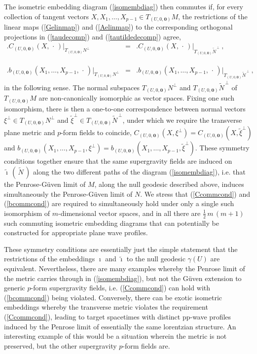 \documentclass[11pt,a4paper]{article}
\newcommand{\mbf}[1]{{\boldsymbol {#1} }}
\def\nn{\nonumber}
\def\bea{\begin{eqnarray}}
\def\eea{\end{eqnarray}}
\begin{document}
The isometric embedding diagram (\ref{isomembdiag}) then commutes if,
for every collection of tangent vectors $X,X_1,\dots,X_{p-1}\in
T_{(U,0,\mbf0)}M$, the restrictions of the linear maps (\ref{Gelinmap})
and (\ref{Aelinmap}) to the corresponding orthogonal projections in
(\ref{taudecomp}) and (\ref{tautildedecomp}) agree,
\bea
\bigl.C_{(U,0,\mbf0)}(X,\,\cdot\,)\bigr|_{T_{(U,0,\mbf0)}N^\perp}&=&
\bigl.C_{(U,0,\mbf0)}(X,\,\cdot\,)\bigr|_{T_{(U,0,\mbf0)}
\widetilde{N}^{\,\perp}} \ , \label{Ccommcond}\\&&{~~~~}^{~~}_{~~}
\nn\\\bigl.b_{(U,0,\mbf0)}(X_1,\ldots,X_{p-1},\,\cdot\,)
\bigr|_{T_{(U,0,\mbf0)}N^\perp}&=&
\bigl.b_{(U,0,\mbf0)}(X_1,\ldots,X_{p-1},\,\cdot\,)\bigr|_{T_{(U,0,\mbf0)}
\widetilde{N}^{\,\perp}} \ ,
\label{bcommcond}\eea
in the following sense. The normal subspaces $T_{(U,0,\mbf0)}N^\perp$ and
$T_{(U,0,\mbf0)}\widetilde{N}^{\,\perp}$ of $T_{(U,0,\mbf0)}M$ are
non-canonically
isomorphic as vector spaces. Fixing one such isomorphism, there is
then a one-to-one correspondence between normal vectors $\xi^\perp\in
T_{(U,0,\mbf0)}N^\perp$ and $\tilde\xi^\perp\in
T_{(U,0,\mbf0)}\widetilde{N}^{\,\perp}$, under which we require the
transverse plane metric and $p$-form fields to coincide,
$C_{(U,0,\mbf0)}(X,\xi^\perp)=C_{(U,0,\mbf0)}(X,\tilde\xi^\perp)$ and
$b_{(U,0,\mbf0)}(X_1,\ldots,X_{p-1},\xi^\perp)=b_{(U,0,\mbf0)}
(X_1,\ldots,X_{p-1},\tilde\xi^\perp)$. These symmetry conditions
together ensure that the same supergravity fields are induced on
$\widetilde{\imath}\,(\,\widetilde{N}\,)$ along the two different
paths of the diagram (\ref{isomembdiag}), i.e. that the
Penrose-G\"uven limit of $M$, along the null geodesic described above,
induces simultaneously the Penrose-G\"uven limit of $N$. We stress that
(\ref{Ccommcond}) and (\ref{bcommcond}) are required to simultaneously
hold under only a single such isomorphism of $m$-dimensional vector
spaces, and in all there are $\frac12\,m\,(m+1)$ such commuting
isometric embedding diagrams that can potentially be constructed for
appropriate plane wave profiles.

These symmetry conditions are essentially just the simple statement
that the restrictions of the embeddings $\imath$ and $\widetilde{\imath}$ to
the null geodesic $\gamma(U)$ are equivalent. Nevertheless, there are
many examples whereby the Penrose limit of the metric carries through
in (\ref{isomembdiag}), but not the G\"uven extension to generic
$p$-form supergravity fields, i.e. (\ref{Ccommcond}) can hold with
(\ref{bcommcond}) being violated. Conversely, there can be exotic
isometric embeddings whereby the transverse metric violates the
requirement (\ref{Ccommcond}), leading to target spacetimes with
distinct pp-wave profiles induced by the Penrose limit of essentially
the same lorentzian structure. An interesting example of this would
be a situation wherein the metric is not preserved, but the other
supergravity $p$-form fields are.
\end{document}
